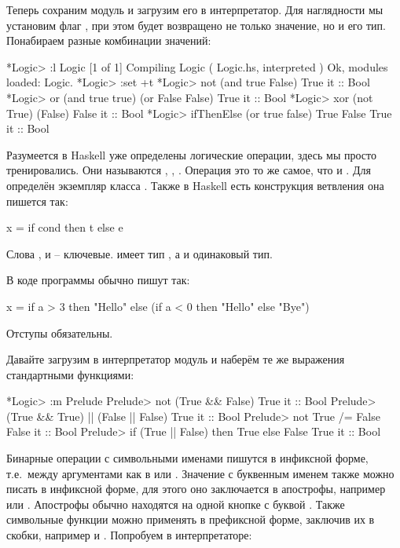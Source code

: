 Теперь сохраним модуль и загрузим его в интерпретатор. 
Для наглядности мы установим флаг , при этом 
будет возвращено не только значение, но и его тип.
Понабираем разные комбинации значений: 

\begin{code}
*Logic> :l Logic
[1 of 1] Compiling Logic            ( Logic.hs, interpreted )
Ok, modules loaded: Logic.
*Logic> :set +t
*Logic> not (and true False)
True
it :: Bool
*Logic> or (and true true) (or False False)
True
it :: Bool
*Logic> xor (not True) (False)
False
it :: Bool
*Logic> ifThenElse (or true false) True False
True
it :: Bool
\end{code}

Разумеется в Haskell уже определены логические операции,
здесь мы просто тренировались. Они называются , 
\In{(&&)}, \In{||}. Операция  это то же самое,
что и \In{(/=)}. Для  определён экземпляр 
класса . Также в Haskell есть конструкция
ветвления она пишется так:

\begin{code}
x = if cond then t else e
\end{code}

Слова  ,  и  -- ключевые. 
 имеет тип , а  и  
одинаковый тип.

В коде программы обычно пишут так:

\begin{code}
x = if a > 3 
    then "Hello"
    else (if a < 0
          then "Hello"
          else "Bye")
\end{code}

Отступы обязательны.

Давайте загрузим в интерпретатор модуль 
и наберём те же выражения стандартными функциями:

\begin{code}
*Logic> :m Prelude
Prelude> not (True && False)
True
it :: Bool
Prelude> (True && True) || (False || False)
True
it :: Bool
Prelude> not True /= False
False
it :: Bool
Prelude> if (True || False) then True else False
True
it :: Bool
\end{code}


Бинарные операции с символьными именами пишутся
в инфиксной форме, т.е.~между аргументами как в 
или . Значение с буквенным именем также можно
писать в инфиксной форме, для этого оно заключается в апострофы,
например  или . Апострофы обычно
находятся на одной кнопке с буквой . Также
символьные функции можно применять в префиксной форме,
заключив их в скобки, например  и .
Попробуем в интерпретаторе:

